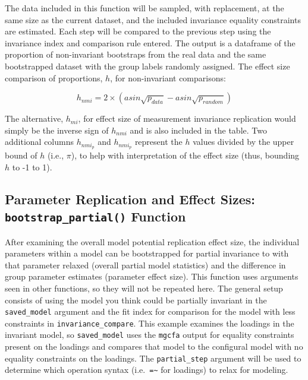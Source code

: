 \documentclass[
  man,floatsintext]{apa7}
\begin{document}
\normalsize

The data included in this function will be sampled, with replacement, at the same size as the current dataset, and the included invariance equality constraints are estimated. Each step will be compared to the previous step using the invariance index and comparison rule entered. The output is a dataframe of the proportion of non-invariant bootstraps from the real data and the same bootstrapped dataset with the group labels randomly assigned. The effect size comparison of proportions, \(h\), for non-invariant comparisons:

\[h_{nmi} = 2 \times (asin\sqrt{p_{data}} - asin\sqrt{p_{random}})\]

The alternative, \(h_{mi}\), for effect size of measurement invariance replication would simply be the inverse sign of \(h_{nmi}\) and is also included in the table. Two additional columns \(h_{nmi_p}\) and \(h_{nmi_p}\) represent the \(h\) values divided by the upper bound of \(h\) (i.e., \(\pi\)), to help with interpretation of the effect size (thus, bounding \(h\) to -1 to 1).

\newpage

\subsection{\texorpdfstring{Parameter Replication and Effect Sizes: \texttt{bootstrap\_partial()} Function}{Parameter Replication and Effect Sizes: bootstrap\_partial() Function}}\label{parameter-replication-and-effect-sizes-bootstrap_partial-function-1}

After examining the overall model potential replication effect size, the individual parameters within a model can be bootstrapped for partial invariance to with that parameter relaxed (overall partial model statistics) and the difference in group parameter estimates (parameter effect size). This function uses arguments seen in other functions, so they will not be repeated here. The general setup consists of using the model you think could be partially invariant in the \texttt{saved\_model} argument and the fit index for comparison for the model with less constraints in \texttt{invariance\_compare}. This example examines the loadings in the invariant model, so \texttt{saved\_model} uses the \texttt{mgcfa} output for equality constraints present on the loadings and compares that model to the configural model with no equality constraints on the loadings. The \texttt{partial\_step} argument will be used to determine which operation syntax (i.e.~\texttt{=\textasciitilde{}} for loadings) to relax for modeling.
\end{document}
